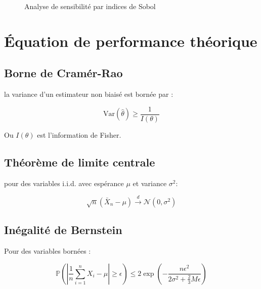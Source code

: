\begin{figure}[H]
	\centering
	\caption{Analyse de sensibilité par indices de Sobol}
	\label{fig: sensitivity-analysis}
\end{figure}

\section{Équation de performance théorique}

\subsection{Borne de  Cramér-Rao}

la variance d'un estimateur non biaisé est bornée par :

\begin{equation}
	\text{Var}(\hat{\theta}) \geq \frac{1}{I(\theta)}
	\label{eq:cramer-rao}
\end{equation}

Ou $I(\theta)$ est l'information de Fisher.

\subsection{Théorème de limite centrale}

pour des variables i.i.d. avec espérance $\mu$ et variance $\sigma^2$:

\begin{equation}
	\sqrt{n}(\bar{X}_n - \mu) \xrightarrow{d} \mathcal{N} (0, \sigma^2)
	\label{eq:central-limit}
\end{equation}

\subsection{Inégalité de Bernstein}
Pour des variables bornées : 

\begin{equation}
	\mathbb{P}\left(\left|\frac{1}{n}\sum_{i=1}^n X_i - \mu\right| \geq \epsilon\right) \leq 2\exp\left(-\frac{n\epsilon^2}{2\sigma^2 + \frac{2}{3}M\epsilon}\right)
	\label{eq:bernstein-inequality}
\end{equation}